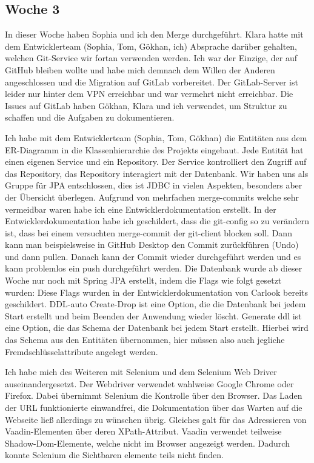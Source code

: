 \subsection{Woche 3}\label{subsec:woche3}
In dieser Woche haben Sophia und ich den Merge durchgeführt.
Klara hatte mit dem Entwicklerteam (Sophia, Tom, Gökhan, ich) Absprache darüber gehalten,
welchen Git-Service wir fortan verwenden werden.
Ich war der Einzige, der auf GitHub bleiben wollte und habe mich demnach dem Willen der Anderen
angeschlossen und die Migration auf GitLab vorbereitet.
Der GitLab-Server ist leider nur hinter dem VPN erreichbar und war vermehrt nicht erreichbar.
Die Issues auf GitLab haben Gökhan, Klara und ich verwendet, um Struktur zu schaffen und
die Aufgaben zu dokumentieren.

Ich habe mit dem Entwicklerteam (Sophia, Tom, Gökhan) die Entitäten aus dem ER-Diagramm
in die Klassenhierarchie des Projekts eingebaut.
Jede Entität hat einen eigenen Service und ein Repository.
Der Service kontrolliert den Zugriff auf das Repository, das Repository interagiert mit der Datenbank.
Wir haben uns als Gruppe für JPA entschlossen, dies ist JDBC in vielen Aspekten,
besonders aber der Übersicht überlegen.
Aufgrund von mehrfachen merge-commits welche sehr vermeidbar waren habe ich eine Entwicklerdokumentation erstellt.
In der Entwicklerdokumentation habe ich geschildert, dass die git-config so zu verändern ist,
dass bei einem versuchten merge-commit der git-client blocken soll.
Dann kann man beispielsweise in GitHub Desktop den Commit zurückführen (Undo) und dann pullen.
Danach kann der Commit wieder durchgeführt werden und es kann problemlos ein push durchgeführt werden.
Die Datenbank wurde ab dieser Woche nur noch mit Spring JPA erstellt, indem die Flags wie folgt gesetzt
wurden:\newline
{}\newline
Diese Flags wurden in der Entwicklerdokumentation von Carlook bereits geschildert.
DDL-auto Create-Drop ist eine Option, die die Datenbank bei jedem Start erstellt und beim Beenden
der Anwendung wieder löscht.
Generate ddl ist eine Option, die das Schema der Datenbank bei jedem Start erstellt.
Hierbei wird das Schema aus den Entitäten übernommen, hier müssen also auch
jegliche Fremdschlüsselattribute angelegt werden.

Ich habe mich des Weiteren mit Selenium und dem Selenium Web Driver auseinandergesetzt.
Der Webdriver verwendet wahlweise Google Chrome oder Firefox.
Dabei übernimmt Selenium die Kontrolle über den Browser.
Das Laden der URL funktionierte einwandfrei, die Dokumentation über das Warten auf die Webseite
ließ allerdings zu wünschen übrig.
Gleiches galt für das Adressieren von Vaadin-Elementen über deren XPath-Attribut.
Vaadin verwendet teilweise Shadow-Dom-Elemente, welche nicht im Browser angezeigt werden.
Dadurch konnte Selenium die Sichtbaren elemente teils nicht finden.


